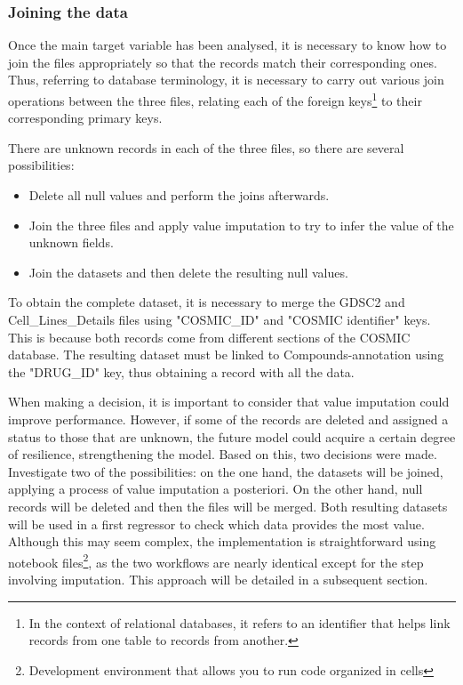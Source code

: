 \subsubsection{Joining the data}

Once the main target variable has been analysed, it is necessary to know how to join the files appropriately so that the records match their corresponding ones. Thus, referring to database terminology, it is necessary to carry out various join operations between the three files, relating each of the foreign keys\footnote{In the context of relational databases, it refers to an identifier that helps link records from one table to records from another.} to their corresponding primary keys.

There are unknown records in each of the three files, so there are several possibilities:
\begin{itemize}
    \item Delete all null values and perform the joins afterwards.
    \item Join the three files and apply value imputation to try to infer the value of the unknown fields.
    \item Join the datasets and then delete the resulting null values.
\end{itemize}

To obtain the complete dataset, it is necessary to merge the GDSC2 and Cell\_Lines\_Details files using  "COSMIC\_ID" and "COSMIC identifier" keys. This is because both records come from different sections of the COSMIC database. The resulting dataset must be linked to Compounds-annotation using the "DRUG\_ID" key, thus obtaining a record with all the data.

When making a decision, it is important to consider that value imputation could improve performance. However, if some of the records are deleted and assigned a status to those that are unknown, the future model could acquire a certain degree of resilience, strengthening the model. Based on this, two decisions were made. Investigate two of the possibilities: on the one hand, the datasets will be joined, applying a process of value imputation a posteriori. On the other hand, null records will be deleted and then the files will be merged. Both resulting datasets will be used in a first regressor to check which data provides the most value. Although this may seem complex, the implementation is straightforward using notebook files\footnote{Development environment that allows you to run code organized in cells}, as the two workflows are nearly identical except for the step involving imputation. This approach will be detailed in a subsequent section.

